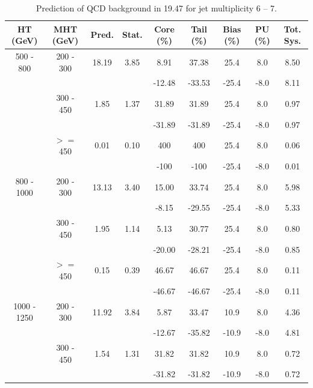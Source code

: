 \begin{table}[htbp]
 \caption{Prediction of QCD background in 19.47 \fbinv for jet multiplicity 6 -- 7.}
 \label{tab:qcd_rs_pred_njet6-7}
  \begin{center}
    \begin{tabular} {c|c|c|c|c|c|c|c|c}
    \hline
    HT (GeV) & MHT (GeV) & Pred. & Stat. & Core (\%) & Tail (\%) & Bias (\%) & PU (\%)& Tot. Sys. \\
    \hline
    500 - 800 & 200 - 300 & 18.19 & 3.85 & 8.91 & 37.38 & 25.4 & 8.0 & 8.50 \\ 
    & & & & -12.48 & -33.53 & -25.4 & -8.0 & 8.11 \\ 
    & 300 - 450 & 1.85 & 1.37 & 31.89 & 31.89 & 25.4 & 8.0 & 0.97 \\ 
    & & & & -31.89 & -31.89 & -25.4 & -8.0 & 0.97 \\ 
    &  $>=$ 450 & 0.01 & 0.10 & 400 & 400 & 25.4 & 8.0 & 0.06 \\ 
    & & & & -100 & -100 & -25.4 & -8.0 & 0.01 \\ 
    \hline
    800 - 1000 & 200 - 300 & 13.13 & 3.40 & 15.00 & 33.74 & 25.4 & 8.0 & 5.98 \\ 
    & & & & -8.15 & -29.55 & -25.4 & -8.0 & 5.33 \\ 
    & 300 - 450 & 1.95 & 1.14 & 5.13 & 30.77 & 25.4 & 8.0 & 0.80 \\ 
    & & & & -20.00 & -28.21 & -25.4 & -8.0 & 0.85 \\ 
    &  $>=$ 450 & 0.15 & 0.39 & 46.67 & 46.67 & 25.4 & 8.0 & 0.11 \\ 
    & & & & -46.67 & -46.67 & -25.4 & -8.0 & 0.11 \\ 
    \hline
    1000 - 1250 & 200 - 300 & 11.92 & 3.84 & 5.87 & 33.47 & 10.9 & 8.0 & 4.36 \\ 
    & & & & -12.67 & -35.82 & -10.9 & -8.0 & 4.81 \\ 
    & 300 - 450 & 1.54 & 1.31 & 31.82 & 31.82 & 10.9 & 8.0 & 0.72 \\ 
    & & & & -31.82 & -31.82 & -10.9 & -8.0 & 0.72 \\ 

\end{tabular}
\end{center}
\end{table}
